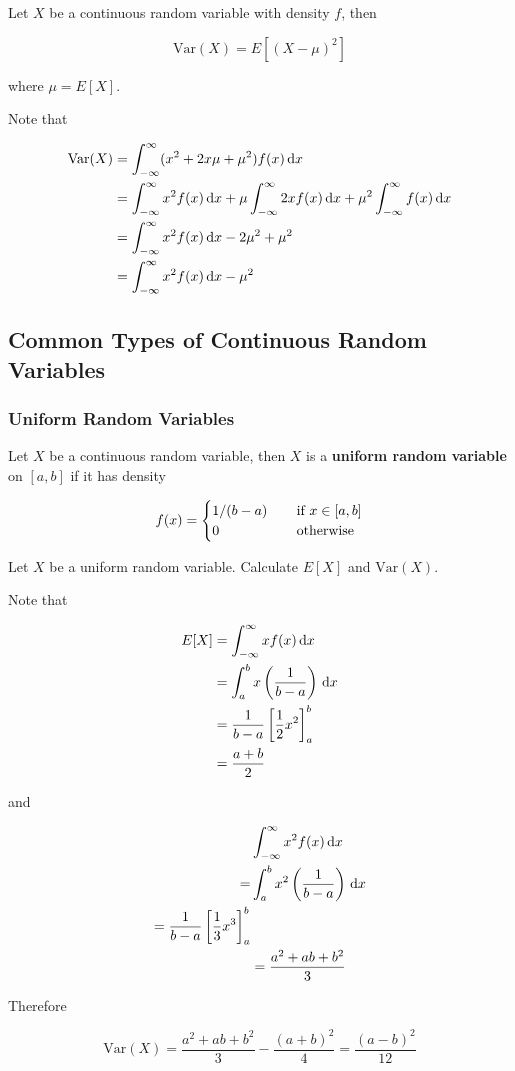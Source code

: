 \documentclass[a4paper,12pt]{article}
\begin{document}
\begin{pst}
  Let $X$ be a continuous random variable with density $f$, then

  $$\mathrm{Var}(X)=E[(X-\mu)^{2}]$$\s

  where $\mu=E[X]$.\n
  
  \prf Note that

  $$\begin{aligned}[t]
    \mathrm{Var}(X)&=\int_{-\infty}^{\infty}(x^{2}+2x\mu+\mu^{2})f(x)\,\mathrm{d} x\\
    &=\int_{-\infty}^{\infty}x^{2}f(x)\,\mathrm{d} x+\mu\int_{-\infty}^{\infty}2xf(x)\,\mathrm{d} x+\mu^{2}\int_{-\infty}^{\infty}f(x)\,\mathrm{d} x\\
    &=\int_{-\infty}^{\infty}x^{2}f(x)\,\mathrm{d} x-2\mu^{2}+\mu^{2}\\
    &=\int_{-\infty}^{\infty}x^{2}f(x)\,\mathrm{d} x-\mu^{2}
  \end{aligned}$$
\end{pst}

\subsection{Common Types of Continuous Random Variables}
\subsubsection{Uniform Random Variables}
\begin{dft}
  Let $X$ be a continuous random variable, then $X$ is a \textbf{uniform random variable} on $[a,b]$ if it has density

  $$f(x)=\begin{cases}
    1/(b-a)&\;\;\;\;\text{if }x\in[a,b]\\
    0&\;\;\;\;\text{otherwise}
  \end{cases}$$
\end{dft}\n

\begin{exm}
  Let $X$ be a uniform random variable. Calculate $E[X]$ and $\mathrm{Var}(X)$.\n

  \ans Note that

  $$\begin{aligned}[t]
    E[X]&=\int_{-\infty}^{\infty}xf(x)\,\mathrm{d} x\\
    &=\int_{a}^{b}x\left( \frac{1}{b-a}\right)\,\mathrm{d} x\\
    &=\frac{1}{b-a}\left[ \frac{1}{2}x^{2}\right]_{a}^{b}\\
    &=\frac{a+b}{2}
  \end{aligned}$$\s

  and

  $$\begin{aligned}[t]
    &\int_{-\infty}^{\infty}x^{2}f(x)\,\mathrm{d} x\\
    =&\int_{a}^{b}x^{2}\left( \frac{1}{b-a}\right)\,\mathrm{d} x\\
    =\frac{1}{b-a}\left[ \frac{1}{3}x^{3}\right]_{a}^{b}\\
    &=\frac{a^{2}+ab+b^{2}}{3}
  \end{aligned}$$\s

  Therefore

  $$\mathrm{Var}(X)=\frac{a^{2}+ab+b^{2}}{3}-\frac{(a+b)^{2}}{4}=\frac{(a-b)^{2}}{12}$$
\end{exm}\n
\end{document}
